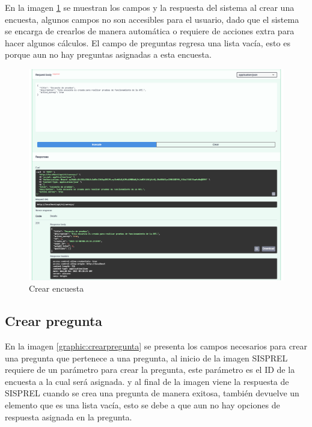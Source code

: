 En la imagen \ref{graphic:crearencuesta} se muestran los campos y la respuesta del sistema al crear una encuesta, algunos campos no son accesibles para el usuario, dado que el sistema se encarga de crearlos de manera automática o requiere de acciones extra para hacer algunos cálculos. El campo de preguntas regresa una lista vacía, esto es porque aun no hay preguntas asignadas a esta encuesta.

\begin{figure}[!htb]
    \centering
    \includegraphics[scale=.3]{TT/img/pruebas/test_create_survey.png}
    \caption{Crear encuesta}
    \label{graphic:crearencuesta}
\end{figure}

\subsection{Crear pregunta}
En la imagen \ref{graphic:crearpregunta} se presenta los campos necesarios para crear una pregunta que pertenece a una pregunta, al inicio de la imagen SISPREL requiere de un parámetro para crear la pregunta, este parámetro es el ID de la encuesta a la cual será asignada. y al final de la imagen viene la respuesta de SISPREL cuando se crea una pregunta de manera exitosa, también devuelve un elemento que es una lista vacía, esto se debe a que aun no hay opciones de respuesta asignada en la pregunta.

